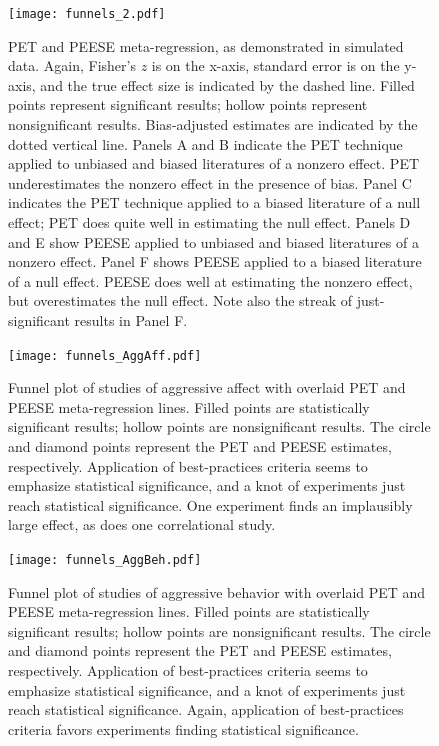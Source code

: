 \documentclass[man, mask]{apa6}
\begin{document}
\begin{figure}
	\texttt{[image: funnels\_2.pdf]}
	\caption{PET and PEESE meta-regression, as demonstrated in simulated data. Again, Fisher's $z$ is on the x-axis, standard error is on the y-axis, and the true effect size is indicated by the dashed line. Filled points represent significant results; hollow points represent nonsignificant results. Bias-adjusted estimates are indicated by the dotted vertical line. Panels A and B indicate the PET technique applied to unbiased and biased literatures of a nonzero effect. PET underestimates the nonzero effect in the presence of bias. Panel C indicates the PET technique applied to a biased literature of a null effect; PET does quite well in estimating the null effect. Panels D and E show PEESE applied to unbiased and biased literatures of a nonzero effect. Panel F shows PEESE applied to a biased literature of a null effect. PEESE does well at estimating the nonzero effect, but overestimates the null effect. Note also the streak of just-significant results in Panel F.}
	\label{funnels2}
\end{figure}

\begin{figure}
	\texttt{[image: funnels\_AggAff.pdf]}
	\caption{Funnel plot of studies of aggressive affect with overlaid PET and PEESE meta-regression lines. Filled points are statistically significant results; hollow points are nonsignificant results. The circle and diamond points represent the PET and PEESE estimates, respectively. Application of best-practices criteria seems to emphasize statistical significance, and a knot of experiments just reach statistical significance. One experiment \citep{Ballard:Wiest:1996} finds an implausibly large effect, as does one correlational study.}
	\label{funnel-aggaff}
\end{figure}

\begin{figure}
	\texttt{[image: funnels\_AggBeh.pdf]}
	\caption{Funnel plot of studies of aggressive behavior with overlaid PET and PEESE meta-regression lines. Filled points are statistically significant results; hollow points are nonsignificant results. The circle and diamond points represent the PET and PEESE estimates, respectively. Application of best-practices criteria seems to emphasize statistical significance, and a knot of experiments just reach statistical significance. Again, application of best-practices criteria favors experiments finding statistical significance.}
	\label{funnel-aggbeh}
\end{figure}
\end{document}
